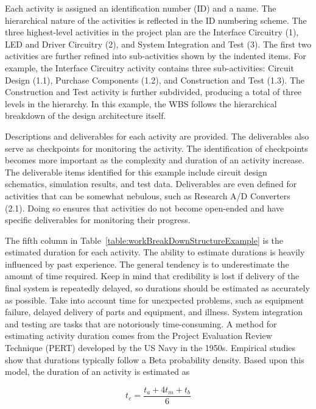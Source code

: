Each activity is assigned an identification number (ID) and a name. The
hierarchical nature of the activities is reflected in the ID numbering
scheme. The three highest-level activities in the project plan are the
Interface Circuitry (1), LED and Driver Circuitry (2), and System
Integration and Test (3). The first two activities are further refined
into sub-activities shown by the indented items. For example, the
Interface Circuitry activity contains three sub-activities: Circuit
Design (1.1), Purchase Components (1.2), and Construction and Test
(1.3). The Construction and Test activity is further subdivided,
producing a total of three levels in the hierarchy. In this example, the
WBS follows the hierarchical breakdown of the design architecture
itself.

Descriptions and deliverables for each activity are provided. The
deliverables also serve as checkpoints for monitoring the activity. The
identification of checkpoints becomes more important as the complexity
and duration of an activity increase. The deliverable items identified
for this example include circuit design schematics, simulation results,
and test data. Deliverables are even defined for activities that can be
somewhat nebulous, such as Research A/D Converters (2.1). Doing so
ensures that activities do not become open-ended and have specific
deliverables for monitoring their progress.

The fifth column in Table~\ref{table:workBreakDownStructureExample} 
is the estimated duration for each
activity. The ability to estimate durations is heavily influenced by
past experience. The general tendency is to underestimate the amount of
time required. Keep in mind that credibility is lost if delivery of the
final system is repeatedly delayed, so durations should be estimated as
accurately as possible. Take into account time for unexpected problems,
such as equipment failure, delayed delivery of parts and equipment, and
illness. System integration and testing are tasks that are notoriously
time-consuming. A method for estimating activity duration comes from the
Project Evaluation Review Technique (PERT) developed by the US Navy in
the 1950s. Empirical studies show that durations typically follow a Beta
probability density. Based upon this model, the duration of an activity
is estimated as

\begin{equation}
\label{equ:projectTimeEstimate}
t_e = \frac{t_a + 4t_m + t_b}{6}
\end{equation}

